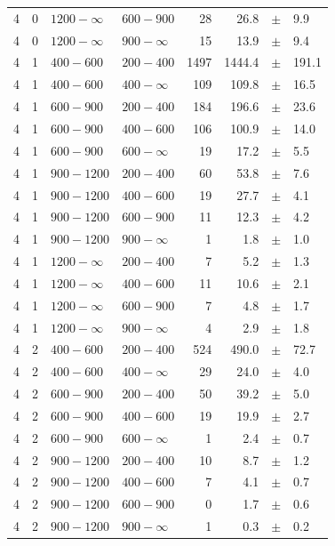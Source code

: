 \begin{table}[!h]
\begin{tabular}{rrllrrcl}
4 & 0 & $1200- \infty$ & $600-900$ &     28 &     26.8 &$\pm$&    9.9 \\
4 & 0 & $1200- \infty$ & $900-\infty$ &     15 &     13.9 &$\pm$&    9.4 \\
4\T & 1 & $ 400- 600$ & $200-400$ &   1497 &   1444.4 &$\pm$&  191.1 \\
4 & 1 & $ 400- 600$ & $400-\infty$ &    109 &    109.8 &$\pm$&   16.5 \\
4\T & 1 & $ 600- 900$ & $200-400$ &    184 &    196.6 &$\pm$&   23.6 \\
4 & 1 & $ 600- 900$ & $400-600$ &    106 &    100.9 &$\pm$&   14.0 \\
4 & 1 & $ 600- 900$ & $600-\infty$ &     19 &     17.2 &$\pm$&    5.5 \\
4\T & 1 & $ 900-1200$ & $200-400$ &     60 &     53.8 &$\pm$&    7.6 \\
4 & 1 & $ 900-1200$ & $400-600$ &     19 &     27.7 &$\pm$&    4.1 \\
4 & 1 & $ 900-1200$ & $600-900$ &     11 &     12.3 &$\pm$&    4.2 \\
4 & 1 & $ 900-1200$ & $900-\infty$ &      1 &      1.8 &$\pm$&    1.0 \\
4\T & 1 & $1200- \infty$ & $200-400$ &      7 &      5.2 &$\pm$&    1.3 \\
4 & 1 & $1200- \infty$ & $400-600$ &     11 &     10.6 &$\pm$&    2.1 \\
4 & 1 & $1200- \infty$ & $600-900$ &      7 &      4.8 &$\pm$&    1.7 \\
4 & 1 & $1200- \infty$ & $900-\infty$ &      4 &      2.9 &$\pm$&    1.8 \\
4\T & 2 & $ 400- 600$ & $200-400$ &    524 &    490.0 &$\pm$&   72.7 \\
4 & 2 & $ 400- 600$ & $400-\infty$ &     29 &     24.0 &$\pm$&    4.0 \\
4\T & 2 & $ 600- 900$ & $200-400$ &     50 &     39.2 &$\pm$&    5.0 \\
4 & 2 & $ 600- 900$ & $400-600$ &     19 &     19.9 &$\pm$&    2.7 \\
4 & 2 & $ 600- 900$ & $600-\infty$ &      1 &      2.4 &$\pm$&    0.7 \\
4\T & 2 & $ 900-1200$ & $200-400$ &     10 &      8.7 &$\pm$&    1.2 \\
4 & 2 & $ 900-1200$ & $400-600$ &      7 &      4.1 &$\pm$&    0.7 \\
4 & 2 & $ 900-1200$ & $600-900$ &      0 &      1.7 &$\pm$&    0.6 \\
4 & 2 & $ 900-1200$ & $900-\infty$ &      1 &      0.3 &$\pm$&    0.2 \\

\end{tabular}
\end{table}
